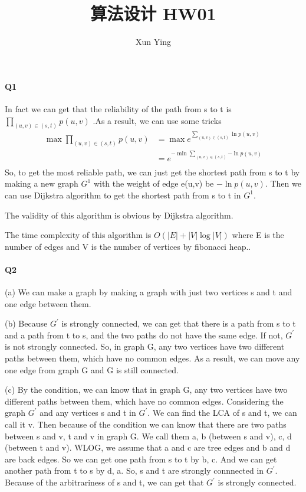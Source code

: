 \documentclass[UTF8]{ctexart}
\renewcommand{\(}{\left(}
\renewcommand{\)}{\right)}
\begin{document}
\title{算法设计 HW01}  
\author{Xun Ying}
\maketitle

\paragraph{Q1} 
In fact we can get that the reliability of the path from s to t is $\prod_{\(u,v\)\in{\(s,t\)}}^{}{p(u,v)}$
.As a result, we can use some tricks 
$$
\begin{aligned}
    \max\prod_{\(u,v\)\in{\(s,t\)}}^{}{p(u,v)}&=\max  {e^{\sum_{\(u,v\)\in{\(s,t\)}}^{}{\ln{p(u,v)}}}} \\
    &={e^{-\min\sum_{\(u,v\)\in{\(s,t\)}}^{}{-\ln{p(u,v)}}}} \\
\end{aligned}
$$
So, to get the most reliable path, we can just get the shortest path from s to t by making a new
graph $G^{1}$ with the weight of edge e(u,v) be $-\ln{p(u,v)}$.
Then we can use Dijkstra algorithm to get the shortest path from s to t in $G^{1}$.

The validity of this algorithm is obvious by Dijkstra algorithm.

The time complexity of this algorithm is $O\({\left| E\right|+\left| V\right|\log{\left| V\right|}}\)$ where E is the number of edges and V is the number of vertices by fibonacci heap..

\paragraph{Q2}

(a) We can make a graph by making a graph with just two vertices s and t and one edge between them. 

(b)  Because $G^{'}$ is strongly connected, we can get that there is a path from s to t and a path from t to s, and the two paths do not have the same edge.
If not, $G^{'}$ is not strongly connected. So, in graph G, any two vertices have two different paths between them, which have no common edges.
As a result, we can move any one edge from graph G and G is still connected.

(c) By the condition, we can know that in graph G, any two vertices have two different paths between them, which have no common edges.
Considering the graph $G^{'}$ and any vertices s and t in $G^{'}$. We can find the LCA of s and t, we can call
it v. Then because of the condition we can know that there are two paths between s and v, t and v in graph G. 
We call them a, b (between s and v), c, d (between t and v). WLOG, we assume that a and c are tree edges and b and
d are back edges. So we can get one path from s to t by b, c. And we can get another path from t to s by d, a. 
So, s and t are strongly connnected in $G^{'}$. Because of the arbitrariness of s and t, we can get that $G^{'}$ is strongly connected.
\end{document}
